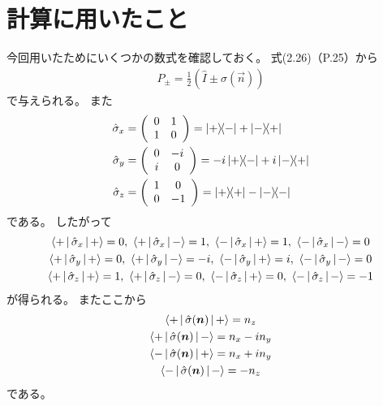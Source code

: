\documentclass[a4paper, 10pt]{jsarticle}
\begin{document}
\section{計算に用いたこと} \label{app:計算}
今回用いたためにいくつかの数式を確認しておく。
式(2.26)（P.25）から
\begin{gather}
	\hat{P}_\pm
	= \frac{1}{2} \left( \hat{I} \pm \hat{\sigma} (\vec{n}) \right)
\end{gather}
で与えられる。
また
\begin{align}
	\hat{\sigma}_x
	&= \left( \begin{array}{cc}
		0 & 1 \\
		1 & 0
	\end{array} \right)
	= \Ketbra{+}{-} + \Ketbra{-}{+} \\
	\hat{\sigma}_y
	&= \left( \begin{array}{cc}
		0 & -i \\
		i & 0
	\end{array} \right)
	= -i \Ketbra{+}{-} + i \Ketbra{-}{+} \\
	\hat{\sigma}_z
	&= \left( \begin{array}{cc}
		1 & 0 \\
		0 & -1
	\end{array} \right)
	= \Ketbra{+}{+} - \Ketbra{-}{-}
\end{align}
である。
したがって
\begin{gather}
	\Braket{+ | \hat{\sigma}_x | +} = 0, \
	\Braket{+ | \hat{\sigma}_x | -} = 1, \
	\Braket{- | \hat{\sigma}_x | +} = 1, \
	\Braket{- | \hat{\sigma}_x | -} = 0 \\
	\Braket{+ | \hat{\sigma}_y | +} = 0, \
	\Braket{+ | \hat{\sigma}_y | -} = -i, \
	\Braket{- | \hat{\sigma}_y | +} = i, \
	\Braket{- | \hat{\sigma}_y | -} = 0 \\
	\Braket{+ | \hat{\sigma}_z | +} = 1, \
	\Braket{+ | \hat{\sigma}_z | -} = 0, \
	\Braket{- | \hat{\sigma}_z | +} = 0, \
	\Braket{- | \hat{\sigma}_z | -} = -1
\end{gather}
が得られる。
またここから
\begin{gather}
	\Braket{+ | \hat{\sigma} (\vec{n}) | +} = n_z \\
	\Braket{+ | \hat{\sigma} (\vec{n}) | -} = n_x - in_y \\
	\Braket{- | \hat{\sigma} (\vec{n}) | +} = n_x + in_y \\
	\Braket{- | \hat{\sigma} (\vec{n}) | -} = -n_z
\end{gather}
である。
\end{document}
